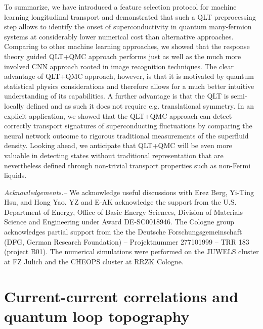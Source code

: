 \documentclass[amsmath,amssymb, aps, prx, longbibliography, twocolumn]{revtex4-1}
\begin{document}
%
To summarize, we have introduced a feature selection protocol for machine learning longitudinal transport and demonstrated that such a QLT preprocessing step allows to identify the onset of superconductivity in quantum many-fermion systems at considerably lower numerical cost than alternative approaches.
Comparing to other machine learning approaches, we showed that the response theory guided QLT+QMC approach performs just as well as the much more involved CNN approach rooted in image recognition techniques. The clear advantage of QLT+QMC approach, however, is that it is motivated by quantum statistical physics considerations and therefore allows for a much better intuitive understanding of its capabilities. A further advantage is that the  QLT is semi-locally defined and as such it does not require e.g. translational symmetry.
In an explicit application, we showed that the QLT+QMC approach can detect correctly transport signatures of superconducting fluctuations by comparing the neural network outcome to rigorous traditional measurements of the superfluid density. 
Looking ahead, we anticipate that QLT+QMC will be even more valuable in detecting states without traditional representation that are nevertheless defined through non-trivial transport properties such as non-Fermi liquids. 



{\it Acknowledgements.--} 
We acknowledge useful discussions with Erez Berg, Yi-Ting Hsu, and Hong Yao. YZ and E-AK acknowledge the support from the U.S. Department of Energy, Office of Basic Energy Sciences, Division of Materials Science and Engineering under Award DE-SC0018946.
The Cologne group acknowledges partial support from the the Deutsche Forschungsgemeinschaft (DFG, German Research Foundation) -- Projektnummer 277101999 -- TRR 183 (project B01).
The numerical simulations were performed on the JUWELS cluster at FZ J\"ulich and the CHEOPS cluster at RRZK Cologne.


%

\appendix

\section{Current-current correlations and quantum loop topography}
\end{document}
